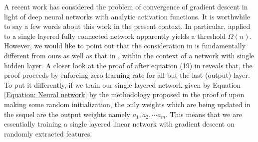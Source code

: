 \documentclass[a4paper,11pt]{amsart}
\theoremstyle{definition}
\theoremstyle{plain}
\theoremstyle{remark}
\begin{document}
A recent work \cite{kawaGradientDescent} has considered the problem of convergence of gradient descent in light of deep neural networks with analytic activation functions. 
It is worthwhile to say a few words about this work in the present context. 
In particular, \cite[Theorem 1]{kawaGradientDescent} applied to a single layered fully connected network apparently yields a threshold $\Omega(n)$. 
However, we would like to point out that the consideration in \cite{kawaGradientDescent} is fundamentally different from ours as well as that in \cite{gdescentOverPara1, gdescentOverPara2}, within the context of a network with single hidden layer.
A closer look at the proof of \cite[Theorem 1]{kawaGradientDescent} after equation (19) in \cite[pp. 5]{kawaGradientDescent} reveals that, the proof proceeds by enforcing zero learning rate for all but the last (output) layer. 
To put it differently, if we train our single layered network given by Equation \eqref{Equation: Neural network} by the methodology proposed in the proof of \cite[Theorem 1]{kawaGradientDescent} upon making some random initialization, the only weights which are being updated in the sequel are the output weights namely $a_1,a_2,\cdots a_m$. 
This means that we are essentially training a single layered linear network with gradient descent on randomly extracted features.
\end{document}
